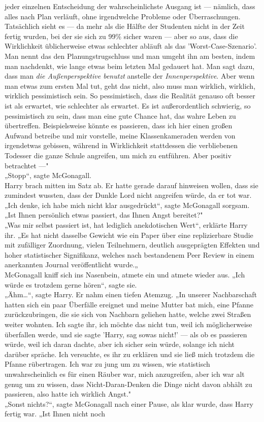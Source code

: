 {jeder einzelnen Entscheidung der wahrscheinlichste Ausgang ist --- nämlich, dass alles nach Plan verläuft, ohne irgendwelche Probleme oder Überraschungen. Tatsächlich sieht es --- da mehr als die Hälfte der Studenten nicht in der Zeit fertig wurden, bei der sie sich zu 99\% sicher waren --- aber so aus, dass die Wirklichkeit üblicherweise etwas schlechter abläuft als das 'Worst-Case-Szenario'. Man nennt das den Planungstrugschluss und man umgeht ihn am besten, indem man nachdenkt, wie lange etwas beim letzten Mal gedauert hat. Man sagt dazu, dass man \emph{die Außenperspektive benutzt} anstelle der \emph{Innenperspektive}. Aber wenn man etwas zum ersten Mal tut, geht das nicht, also muss man wirklich, wirklich, wirklich pessimistisch sein. So pessimistisch, dass die Realität genauso oft besser ist als erwartet, wie schlechter als erwartet. Es ist außerordentlich schwierig, so pessimistisch zu sein, dass man eine gute Chance hat, das wahre Leben zu übertreffen. Beispielsweise könnte es passieren, dass ich hier einen großen Aufwand betreibe und mir vorstelle, meine Klassenkameraden werden von irgendetwas gebissen, während in Wirklichkeit stattdessen die verbliebenen Todesser die ganze Schule angreifen, um mich zu entführen. Aber positiv betrachtet ---"\\ „Stopp“, sagte McGonagall.\\ Harry brach mitten im Satz ab. Er hatte gerade darauf hinweisen wollen, dass sie zumindest wussten, dass der Dunkle Lord nicht angreifen würde, da er tot war.\\ „Ich denke, ich habe mich nicht klar ausgedrückt“, sagte McGonagall sorgsam. „Ist Ihnen persönlich etwas passiert, das Ihnen Angst bereitet?"\\ „Was mir selbst passiert ist, hat lediglich anekdotischen Wert“, erklärte Harry ihr. „Es hat nicht dasselbe Gewicht wie ein Paper über eine replizierbare Studie mit zufälliger Zuordnung, vielen Teilnehmern, deutlich ausgeprägten Effekten und hoher statistischer Signifikanz, welches nach bestandenem Peer Review in einem anerkannten Journal veröffentlicht wurde.„\\ McGonagall kniff sich ins Nasenbein, atmete ein und atmete wieder aus. „Ich würde es trotzdem gerne hören“, sagte sie.\\ „Ähm…“, sagte Harry. Er nahm einen tiefen Atemzug. „In unserer Nachbarschaft hatten sich ein paar Überfälle ereignet und meine Mutter bat mich, eine Pfanne zurückzubringen, die sie sich von Nachbarn geliehen hatte, welche zwei Straßen weiter wohnten. Ich sagte ihr, ich möchte das nicht tun, weil ich möglicherweise überfallen werde, und sie sagte 'Harry, sag sowas nicht!' --- als ob es passieren würde, weil ich daran dachte, aber ich sicher sein würde, solange ich nicht darüber spräche. Ich versuchte, es ihr zu erklären und sie ließ mich trotzdem die Pfanne rübertragen. Ich war zu jung um zu wissen, wie statistisch unwahrscheinlich es für einen Räuber war, mich anzugreifen, aber ich war alt genug um zu wissen, dass Nicht-Daran-Denken die Dinge nicht davon abhält zu passieren, also hatte ich wirklich Angst."\\ „Sonst nichts?“, sagte McGonagall nach einer Pause, als klar wurde, dass Harry fertig war. „Ist Ihnen nicht noch }
